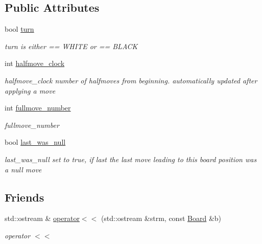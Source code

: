 \subsection*{Public Attributes}
\begin{DoxyCompactItemize}
\item 
\hypertarget{classchess_1_1Board_a1726413a7710da68c1d87c190d59ff2d}{bool \hyperlink{classchess_1_1Board_a1726413a7710da68c1d87c190d59ff2d}{turn}}\label{classchess_1_1Board_a1726413a7710da68c1d87c190d59ff2d}

\begin{DoxyCompactList}\small\item\em turn is either == W\-H\-I\-T\-E or == B\-L\-A\-C\-K \end{DoxyCompactList}\item 
\hypertarget{classchess_1_1Board_a5560fe97c8de0895aad63a16f2fe989d}{int \hyperlink{classchess_1_1Board_a5560fe97c8de0895aad63a16f2fe989d}{halfmove\-\_\-clock}}\label{classchess_1_1Board_a5560fe97c8de0895aad63a16f2fe989d}

\begin{DoxyCompactList}\small\item\em halfmove\-\_\-clock number of halfmoves from beginning. automatically updated after applying a move \end{DoxyCompactList}\item 
\hypertarget{classchess_1_1Board_a2e62bd7f7c8a08a06f60b0a5c4d9f0f9}{int \hyperlink{classchess_1_1Board_a2e62bd7f7c8a08a06f60b0a5c4d9f0f9}{fullmove\-\_\-number}}\label{classchess_1_1Board_a2e62bd7f7c8a08a06f60b0a5c4d9f0f9}

\begin{DoxyCompactList}\small\item\em fullmove\-\_\-number \end{DoxyCompactList}\item 
\hypertarget{classchess_1_1Board_ab804a92f19458640a977ec4a713e4f7b}{bool \hyperlink{classchess_1_1Board_ab804a92f19458640a977ec4a713e4f7b}{last\-\_\-was\-\_\-null}}\label{classchess_1_1Board_ab804a92f19458640a977ec4a713e4f7b}

\begin{DoxyCompactList}\small\item\em last\-\_\-was\-\_\-null set to true, if last the last move leading to this board position was a null move \end{DoxyCompactList}\end{DoxyCompactItemize}
\subsection*{Friends}
\begin{DoxyCompactItemize}
\item 
std\-::ostream \& \hyperlink{classchess_1_1Board_a12c9a3f04eea162630a1cffdb8560667}{operator$<$$<$} (std\-::ostream \&strm, const \hyperlink{classchess_1_1Board}{Board} \&b)
\begin{DoxyCompactList}\small\item\em operator $<$$<$ \end{DoxyCompactList}\end{DoxyCompactItemize}


